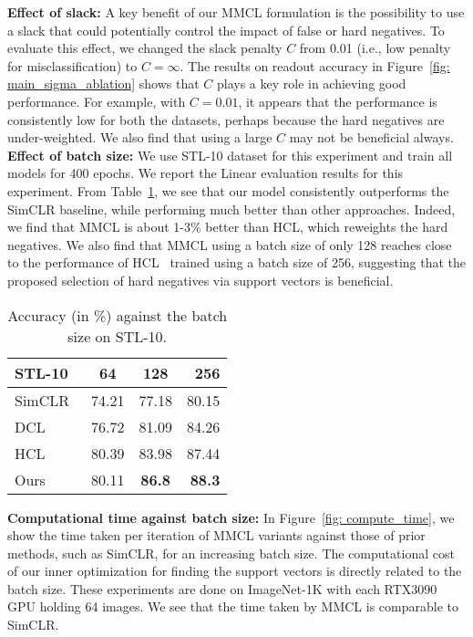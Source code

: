 \documentclass[letterpaper]{article} \usepackage{aaai22}  \usepackage{times}  \usepackage{helvet}  \usepackage{courier}  \usepackage[hyphens]{url}  \usepackage{graphicx} \urlstyle{rm} \def\UrlFont{\rm}  \usepackage{natbib}  \usepackage{caption} \DeclareCaptionStyle{ruled}{labelfont=normalfont,labelsep=colon,strut=off} \frenchspacing  \setlength{\pdfpagewidth}{8.5in}  \setlength{\pdfpageheight}{11in}
\begin{document}
\noindent\textbf{Effect of slack:} A key benefit of our MMCL formulation is the possibility to use a slack that could potentially control the impact of false or hard negatives. To evaluate this effect,  we changed the slack penalty $C$ from 0.01 (i.e., low penalty for misclassification) to $C=\infty$. The results on readout accuracy in Figure~\ref{fig: main_sigma_ablation} shows that $C$ plays a key role in achieving good performance. For example, with $C=0.01$, it appears that the performance is consistently low for both the datasets, perhaps because the hard negatives are under-weighted. We also find that using a large $C$ may not be beneficial always.
\\
\noindent\textbf{Effect of batch size:}
We use STL-10 dataset for this experiment and train all models for 400 epochs. We report the Linear evaluation results for this experiment. From Table~\ref{tab: small_datasets_sota}, we see that our model consistently outperforms the SimCLR baseline, while performing much better than other approaches. Indeed, we find that MMCL is about 1-3\% better than HCL, which reweights the hard negatives. We also find that MMCL using a batch size of only 128 reaches close to the performance of HCL~\cite{robinson2021contrastive} trained using a batch size of 256, suggesting that the proposed selection of hard negatives via support vectors is beneficial. 
\\
\begin{table}[]
    \centering
    \begin{tabular}{lccr}
            \toprule
            STL-10  & 64 & 128 & 256  \\
            \midrule
            SimCLR~\cite{chen2020simple}  & 74.21 & 77.18 &  80.15  \\
           DCL~\cite{chuang2020debiased}  & 76.72 & 81.09 & 84.26     \\
          HCL~\cite{robinson2021contrastive}  & 80.39 & 83.98 & 87.44   \\
            \midrule
            Ours  & 80.11 & \textbf{86.8} & \textbf{88.3} \\
            \bottomrule
            \end{tabular}
    \caption{Accuracy (in \%) against the batch size on STL-10.}
    \label{tab: small_datasets_sota}
\end{table}
\noindent\textbf{Computational time against batch size:}
In Figure~\ref{fig: compute_time}, we show the time taken per iteration of MMCL variants against those of prior methods, such as SimCLR, for an increasing batch size. The computational cost of our inner optimization for finding the support vectors is directly related to the batch size. These experiments are done on ImageNet-1K with each RTX3090 GPU holding 64 images. We see that the time taken by MMCL is comparable to SimCLR.
\end{document}
